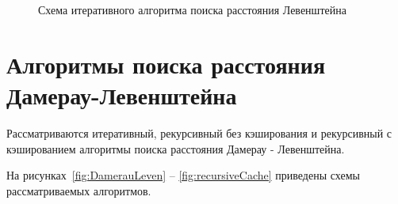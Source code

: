 \begin{figure}[h]
	
	
	\caption{Схема итеративного алгоритма поиска расстояния Левенштейна}
	
	\label{fig:Levenstain}
\end{figure}

\clearpage

\section{Алгоритмы поиска расстояния Дамерау-Левенштейна}

Рассматриваются итеративный, рекурсивный без кэширования и рекурсивный с кэшированием алгоритмы поиска расстояния Дамерау - Левенштейна.

На рисунках~\ref{fig:DamerauLeven} -- \ref{fig:recursiveCache} приведены схемы рассматриваемых алгоритмов.

